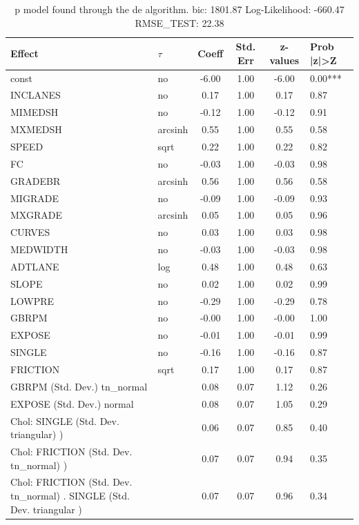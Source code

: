 \begin{table}
	\caption{p model found through the de algorithm. bic: 1801.87 Log-Likelihood: -660.47 RMSE_TEST: 22.38}
	\begin{center}
		\begin{tabular}{|l|l|c|c|c|l|}
			\hline
			Effect & $\tau$ & Coeff & Std. Err & z-values & Prob |z|>Z \\
			\hline
			const & no & -6.00 & 1.00 & -6.00 & 0.00*** \\
			\hline
			INCLANES & no & 0.17 & 1.00 & 0.17 & 0.87 \\
			\hline
			MIMEDSH & no & -0.12 & 1.00 & -0.12 & 0.91 \\
			\hline
			MXMEDSH & arcsinh & 0.55 & 1.00 & 0.55 & 0.58 \\
			\hline
			SPEED & sqrt & 0.22 & 1.00 & 0.22 & 0.82 \\
			\hline
			FC & no & -0.03 & 1.00 & -0.03 & 0.98 \\
			\hline
			GRADEBR & arcsinh & 0.56 & 1.00 & 0.56 & 0.58 \\
			\hline
			MIGRADE & no & -0.09 & 1.00 & -0.09 & 0.93 \\
			\hline
			MXGRADE & arcsinh & 0.05 & 1.00 & 0.05 & 0.96 \\
			\hline
			CURVES & no & 0.03 & 1.00 & 0.03 & 0.98 \\
			\hline
			MEDWIDTH & no & -0.03 & 1.00 & -0.03 & 0.98 \\
			\hline
			ADTLANE & log & 0.48 & 1.00 & 0.48 & 0.63 \\
			\hline
			SLOPE & no & 0.02 & 1.00 & 0.02 & 0.99 \\
			\hline
			LOWPRE & no & -0.29 & 1.00 & -0.29 & 0.78 \\
			\hline
			GBRPM & no & -0.00 & 1.00 & -0.00 & 1.00 \\
			\hline
			EXPOSE & no & -0.01 & 1.00 & -0.01 & 0.99 \\
			\hline
			SINGLE & no & -0.16 & 1.00 & -0.16 & 0.87 \\
			\hline
			FRICTION & sqrt & 0.17 & 1.00 & 0.17 & 0.87 \\
			\hline
			GBRPM (Std. Dev.) tn_normal &  & 0.08 & 0.07 & 1.12 & 0.26 \\
			\hline
			EXPOSE (Std. Dev.) normal &  & 0.08 & 0.07 & 1.05 & 0.29 \\
			\hline
			 Chol: SINGLE (Std. Dev. triangular) ) &  & 0.06 & 0.07 & 0.85 & 0.40 \\
			\hline
			 Chol: FRICTION (Std. Dev. tn_normal) ) &  & 0.07 & 0.07 & 0.94 & 0.35 \\
			\hline
			 Chol: FRICTION (Std. Dev. tn_normal) . SINGLE (Std. Dev.   triangular ) &  & 0.07 & 0.07 & 0.96 & 0.34 \\
			\hline
		\end{tabular}
	\end{center}
\end{table}